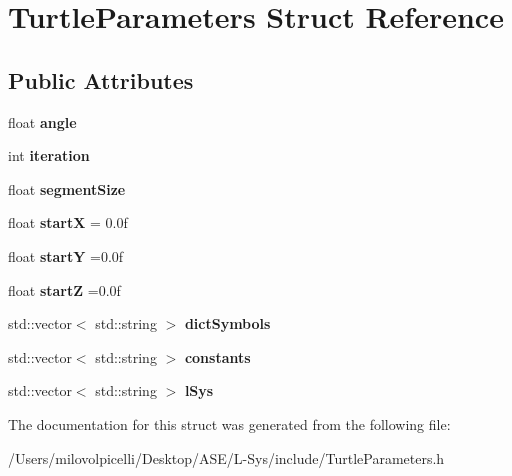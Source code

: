 \hypertarget{struct_turtle_parameters}{}\section{Turtle\+Parameters Struct Reference}
\label{struct_turtle_parameters}
\subsection*{Public Attributes}
\begin{DoxyCompactItemize}
\item 
\mbox{\label{struct_turtle_parameters_af466b95152d9940481f1b9c0bdff8f70}} 
float {\bfseries angle}
\item 
\mbox{\label{struct_turtle_parameters_ae9e92077053cca835603969b22e33892}} 
int {\bfseries iteration}
\item 
\mbox{\label{struct_turtle_parameters_a2fe5bbf12c337b88aef2736b01a0ed58}} 
float {\bfseries segment\+Size}
\item 
\mbox{\label{struct_turtle_parameters_a897fa4563999089a9966b7f65f059474}} 
float {\bfseries startX} = 0.\+0f
\item 
\mbox{\label{struct_turtle_parameters_a1c6013324b05f92b4f31fc1e7b8ceb41}} 
float {\bfseries startY} =0.\+0f
\item 
\mbox{\label{struct_turtle_parameters_ad1c80d528d2783139331d0ca20f84fe5}} 
float {\bfseries startZ} =0.\+0f
\item 
\mbox{\label{struct_turtle_parameters_a58b0a1e407047f305115bcc8b79bea71}} 
std\+::vector$<$ std\+::string $>$ {\bfseries dict\+Symbols}
\item 
\mbox{\label{struct_turtle_parameters_a8fe4de36600ec341334af6d05eda96c4}} 
std\+::vector$<$ std\+::string $>$ {\bfseries constants}
\item 
\mbox{\label{struct_turtle_parameters_a388e51be6fb1794199f4694fea422430}} 
std\+::vector$<$ std\+::string $>$ {\bfseries l\+Sys}
\end{DoxyCompactItemize}


The documentation for this struct was generated from the following file\+:\begin{DoxyCompactItemize}
\item 
/\+Users/milovolpicelli/\+Desktop/\+A\+S\+E/\+L-\/\+Sys/include/Turtle\+Parameters.\+h\end{DoxyCompactItemize}
